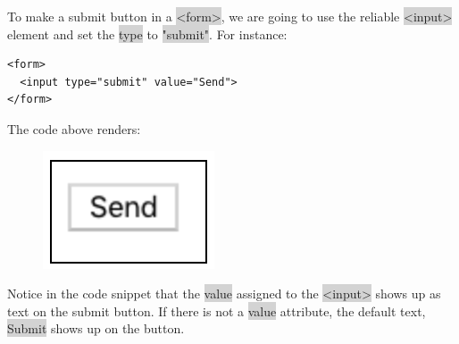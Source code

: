 \documentclass[11pt]{article}
\begin{document}
To make a submit button in a \colorbox{lightgray}{<form>}, we are going to use the reliable \colorbox{lightgray}{<input>} element and set the \colorbox{lightgray}{type} to \colorbox{lightgray}{"submit"}. For instance:
\begin{lstlisting}
<form>
  <input type="submit" value="Send">
</form>
\end{lstlisting}
The code above renders:
\begin{figure}[H]
\includegraphics[scale = 0.8]{3_16}
\centering
\end{figure}
\vspace{-4mm}
Notice in the code snippet that the \colorbox{lightgray}{value} assigned to the \colorbox{lightgray}{<input>} shows up as text on the submit button. If there is not a \colorbox{lightgray}{value} attribute, the default text, \colorbox{lightgray}{Submit} shows up on the button.
\end{document}
